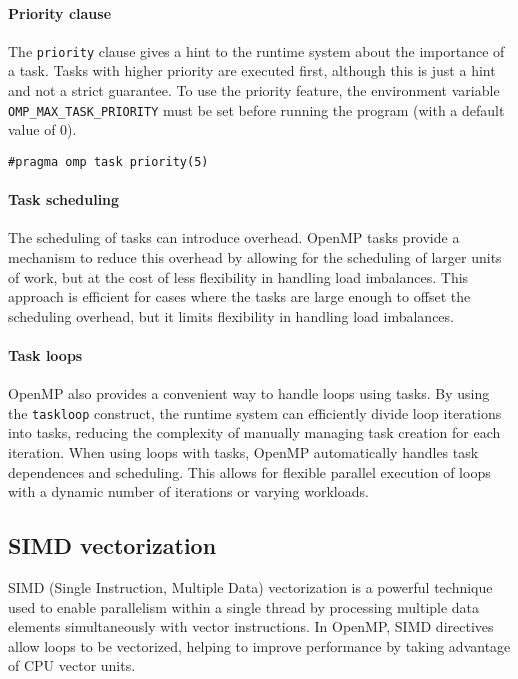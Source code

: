 \paragraph*{Priority clause}
The \texttt{priority} clause gives a hint to the runtime system about the importance of a task. 
Tasks with higher priority are executed first, although this is just a hint and not a strict guarantee. 
To use the priority feature, the environment variable \texttt{OMP\_MAX\_TASK\_PRIORITY} must be set before running the program (with a default value of 0).
\begin{lstlisting}[style=C]
#pragma omp task priority(5)
\end{lstlisting}

\paragraph*{Task scheduling}
The scheduling of tasks can introduce overhead. 
OpenMP tasks provide a mechanism to reduce this overhead by allowing for the scheduling of larger units of work, but at the cost of less flexibility in handling load imbalances.
This approach is efficient for cases where the tasks are large enough to offset the scheduling overhead, but it limits flexibility in handling load imbalances.

\paragraph*{Task loops}
OpenMP also provides a convenient way to handle loops using tasks.
By using the \texttt{taskloop} construct, the runtime system can efficiently divide loop iterations into tasks, reducing the complexity of manually managing task creation for each iteration.
\noindent When using loops with tasks, OpenMP automatically handles task dependences and scheduling. 
This allows for flexible parallel execution of loops with a dynamic number of iterations or varying workloads.

\subsection{SIMD vectorization}
SIMD (Single Instruction, Multiple Data) vectorization is a powerful technique used to enable parallelism within a single thread by processing multiple data elements simultaneously with vector instructions. 
In OpenMP, SIMD directives allow loops to be vectorized, helping to improve performance by taking advantage of CPU vector units.

